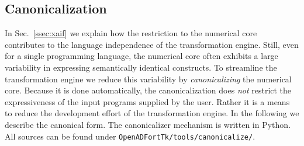 \documentclass{book}
\newcommand{\code}[1]{{\small\tt{#1}}}
\newcommand{\refsec}[1]{{Sec.~\ref{#1}}}
\begin{document}
\subsection{Canonicalization}\label{sssec:Canonicalization}
In \refsec{ssec:xaif} we explain how the restriction to the numerical core 
contributes to the  language independence of the transformation
engine.
Still, even for a single programming language, the numerical 
core often exhibits a large variability in expressing semantically 
identical constructs. 
To streamline the transformation engine we reduce this variability by 
{\em canonicalizing} the numerical core. 
Because it is done automatically, the canonicalization does \emph{not} 
restrict the expressiveness of the input programs supplied by the user.
Rather it is a means to reduce the development effort of the transformation engine. 
In the following we describe the canonical form. The canonicalizer mechanism is written 
in Python. All sources can be found under \code{OpenADFortTk/tools/canonicalize/}.
\end{document}
